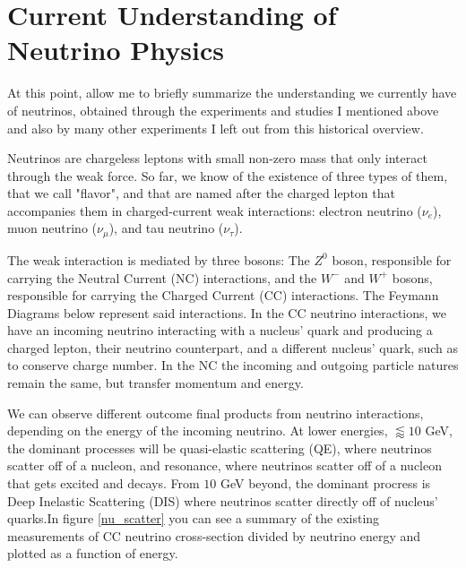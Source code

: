 \section{Current Understanding of Neutrino Physics}

At this point, allow me to briefly summarize the understanding we currently have of neutrinos, obtained through the experiments and studies I mentioned above and also by many other experiments I left out from this historical overview. 

Neutrinos are chargeless leptons with small non-zero mass that only interact through the weak force. So far, we know of the existence of three types of them, that we call "flavor", and that are named after the charged lepton that accompanies them in charged-current weak interactions: electron neutrino ($\nu_e$), muon neutrino ($\nu_{\mu}$), and tau neutrino ($\nu_{\tau}$). 

The weak interaction is mediated by three bosons: The $Z^{0}$ boson, responsible for carrying the Neutral Current (NC) interactions, and the $W^{-}$ and $W^{+}$ bosons, responsible for carrying the Charged Current (CC) interactions. The Feymann Diagrams below represent said interactions. In the CC neutrino interactions, we have an incoming neutrino interacting with a nucleus' quark and producing a charged lepton, their neutrino counterpart, and a different nucleus' quark, such as to conserve charge number. In the NC the incoming and outgoing particle natures remain the same, but transfer momentum and energy. 

We can observe different outcome final products from neutrino interactions, depending on the energy of the incoming neutrino. At lower energies, $\lessapprox 10$ GeV, the dominant processes will be quasi-elastic scattering (QE), where neutrinos scatter off of a nucleon, and resonance, where neutrinos scatter off of a nucleon that gets excited and decays. From $10$ GeV beyond, the dominant procress is Deep Inelastic Scattering (DIS) where neutrinos scatter directly off of nucleus' quarks.In figure \ref{nu_scatter} you can see a summary of the existing measurements of CC neutrino cross-section divided by neutrino energy and plotted as a function of energy. 

